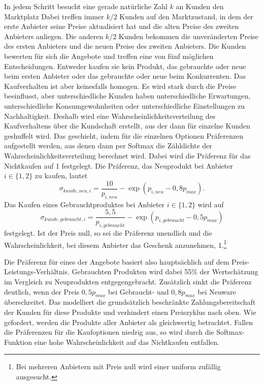 In jedem Schritt besucht eine gerade natürliche Zahl $k$ an Kunden den Marktplatz
Dabei treffen immer $k / 2$ Kunden auf den Marktzustand, in dem der erste Anbieter seine Preise aktualisiert hat und die alten Preise des zweiten Anbieters anliegen.
Die anderen $k / 2$ Kunden bekommen die unveränderten Preise des ersten Anbieters und die neuen Preise des zweiten Anbieters.
Die Kunden bewerten für sich die Angebote und treffen eine von fünf möglichen Entscheidungen.
Entweder kaufen sie kein Produkt, das gebrauchte oder neue beim ersten Anbieter oder das gebrauchte oder neue beim Konkurrenten.
Das Kaufverhalten ist aber keinesfalls homogen.
Es wird stark durch die Preise beeinflusst, aber unterschiedliche Kunden haben unterschiedliche Erwartungen, unterschiedliche Konsumgewohnheiten oder unterschiedliche Einstellungen zu Nachhaltigkeit.
Deshalb wird eine Wahrscheinlichkeitsverteilung des Kaufverhaltens über die Kundschaft erstellt, aus der dann für einzelne Kunden geshuffelt wird.
Das geschieht, indem für die einzelnen Optionen Präferenzen aufgestellt werden, aus denen dann per Softmax die Zähldichte der Wahrscheinlichkeitsverteilung berechnet wird.
Dabei wird die Präferenz für das Nichtkaufen auf 1 festgelegt.
Die Präferenz, das Neuprodukt bei Anbieter $i\in\{1, 2\}$ zu kaufen, lautet
\begin{equation}
	\sigma_{kunde, neu, i} = \frac{10}{p_{i, neu}} - \exp{(p_{i, neu} - 0,8 p_{max})}.
\end{equation}
Das Kaufen eines Gebrauchtproduktes bei Anbieter $i\in\{1, 2\}$ wird auf
\begin{equation}
	\sigma_{kunde, gebraucht, i} = \frac{5,5}{p_{i, gebraucht}} - \exp{(p_{i, gebraucht} - 0,5 p_{max})}
\end{equation}
festgelegt.
Ist der Preis null, so sei die Präferenz unendlich und die Wahrscheinlichkeit, bei diesem Anbieter das Geschenk anzunehmen, 1.\footnote{Bei mehreren Anbietern mit Preis null wird einer uniform zufällig ausgesucht.}

Die Präferenz für eines der Angebote basiert also hauptsächlich auf dem Preis-Leistungs-Verhältnis.
Gebrauchten Produkten wird dabei 55\% der Wertschätzung im Vergleich zu Neuprodukten entgegengebracht.
Zusätzlich sinkt die Präferenz deutlich, wenn der Preis $0,5 p_{max}$ bei Gebraucht- und $0,8 p_{max}$ bei Neuware überschreitet.
Das modelliert die grundsätzlich beschränkte Zahlungsbereitschaft der Kunden für diese Produkte und verhindert einen Preiszyklus nach oben.
Wie gefordert, werden die Produkte aller Anbieter als gleichwertig betrachtet.
Fallen die Präferenzen für die Kaufoptionen niedrig aus, so wird durch die Softmax-Funktion eine hohe Wahrscheinlichkeit auf das Nichtkaufen entfallen.

